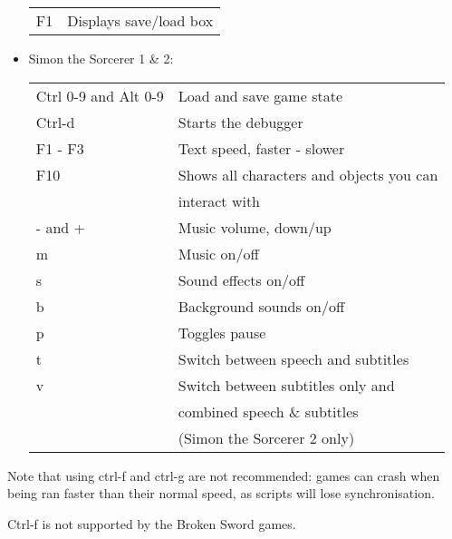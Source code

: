 \begin{itemize}
\begin{tabular}{ll}
    F1                     & Displays save/load box\\
  \end{tabular}
\item Simon the Sorcerer 1 \& 2:\\
  \begin{tabular}{ll}
    Ctrl 0-9 and Alt 0-9   & Load and save game state\\
    Ctrl-d                 & Starts the debugger\\
    F1 - F3                & Text speed, faster - slower\\
    F10                    & Shows all characters and objects you can \\
                           & interact with\\
    - and +                & Music volume, down/up\\
    m                      & Music on/off\\
    s                      & Sound effects on/off\\
    b                      & Background sounds on/off\\
    p                      & Toggles pause\\
    t                      & Switch between speech and subtitles\\
    v                      & Switch between subtitles only and\\
                           & combined speech \& subtitles\\
                           & (Simon the Sorcerer 2 only)\\
  \end{tabular}
\end{itemize}
Note that using ctrl-f and ctrl-g are not recommended: games can crash when
being ran faster than their normal speed, as scripts will lose synchronisation.

Ctrl-f is not supported by the Broken Sword games.
